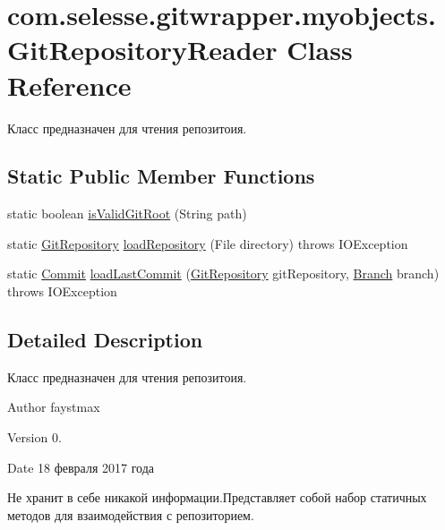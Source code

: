 \hypertarget{classcom_1_1selesse_1_1gitwrapper_1_1myobjects_1_1_git_repository_reader}{}\section{com.\+selesse.\+gitwrapper.\+myobjects.\+Git\+Repository\+Reader Class Reference}
\label{classcom_1_1selesse_1_1gitwrapper_1_1myobjects_1_1_git_repository_reader}


Класс предназначен для чтения репозитоия.  


\subsection*{Static Public Member Functions}
\begin{DoxyCompactItemize}
\item 
static boolean \hyperlink{classcom_1_1selesse_1_1gitwrapper_1_1myobjects_1_1_git_repository_reader_a734f08d9550fd1add83ab661ca390f3a}{is\+Valid\+Git\+Root} (String path)
\item 
static \hyperlink{classcom_1_1selesse_1_1gitwrapper_1_1myobjects_1_1_git_repository}{Git\+Repository} \hyperlink{classcom_1_1selesse_1_1gitwrapper_1_1myobjects_1_1_git_repository_reader_a1222bafab6af4b53b886a900351faaa6}{load\+Repository} (File directory)  throws I\+O\+Exception 
\item 
static \hyperlink{classcom_1_1selesse_1_1gitwrapper_1_1myobjects_1_1_commit}{Commit} \hyperlink{classcom_1_1selesse_1_1gitwrapper_1_1myobjects_1_1_git_repository_reader_a757d33ee7433b695d6963c7809116ab9}{load\+Last\+Commit} (\hyperlink{classcom_1_1selesse_1_1gitwrapper_1_1myobjects_1_1_git_repository}{Git\+Repository} git\+Repository, \hyperlink{classcom_1_1selesse_1_1gitwrapper_1_1myobjects_1_1_branch}{Branch} branch)  throws I\+O\+Exception 
\end{DoxyCompactItemize}


\subsection{Detailed Description}
Класс предназначен для чтения репозитоия. 

\begin{DoxyAuthor}{Author}
faystmax 
\end{DoxyAuthor}
\begin{DoxyVersion}{Version}
0. 
\end{DoxyVersion}
\begin{DoxyDate}{Date}
18 февраля 2017 года 
\end{DoxyDate}
Не хранит в себе никакой информации.\+Представляет собой набор статичных методов для взаимодействия с репозиторием. 

